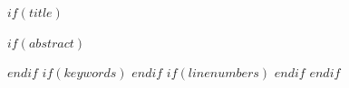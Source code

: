 %
$if(title)$
\maketitle
\thispagestyle{title}
$if(abstract)$
\begin{abstract}
\noindent $abstract$
\end{abstract}
$endif$
$if(keywords)$
\noindent {}
$endif$
$if(linenumbers)$
\linenumbers
$endif$
\newpage
$endif$